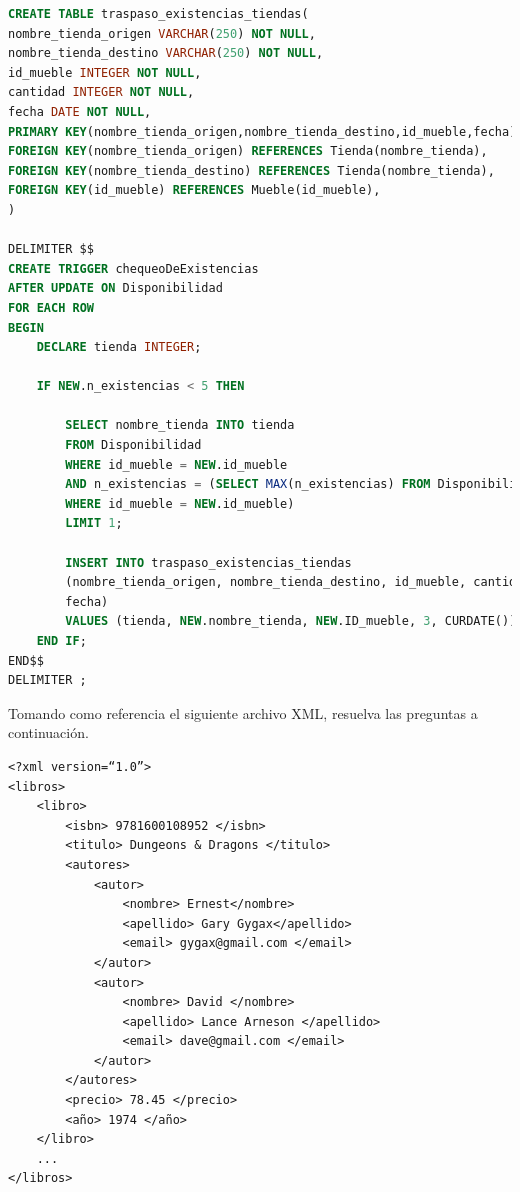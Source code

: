 \documentclass[
    12pt,
    a4paper,
    addpoints,
    answers,
    convocatoria=ord,
    titulacion=NoCD,
    curso=2022/2023,
]{db-exam}
\begin{document}
\begin{questions}
\begin{parts}
\begin{solution}
\begin{lstlisting}[language=sql]
CREATE TABLE traspaso_existencias_tiendas(
nombre_tienda_origen VARCHAR(250) NOT NULL,
nombre_tienda_destino VARCHAR(250) NOT NULL,
id_mueble INTEGER NOT NULL,
cantidad INTEGER NOT NULL,
fecha DATE NOT NULL,
PRIMARY KEY(nombre_tienda_origen,nombre_tienda_destino,id_mueble,fecha),
FOREIGN KEY(nombre_tienda_origen) REFERENCES Tienda(nombre_tienda),
FOREIGN KEY(nombre_tienda_destino) REFERENCES Tienda(nombre_tienda),
FOREIGN KEY(id_mueble) REFERENCES Mueble(id_mueble),
)

DELIMITER $$
CREATE TRIGGER chequeoDeExistencias
AFTER UPDATE ON Disponibilidad
FOR EACH ROW
BEGIN
    DECLARE tienda INTEGER;

    IF NEW.n_existencias < 5 THEN
    
        SELECT nombre_tienda INTO tienda
        FROM Disponibilidad
        WHERE id_mueble = NEW.id_mueble
        AND n_existencias = (SELECT MAX(n_existencias) FROM Disponibilidad
        WHERE id_mueble = NEW.id_mueble)
        LIMIT 1;

        INSERT INTO traspaso_existencias_tiendas 
        (nombre_tienda_origen, nombre_tienda_destino, id_mueble, cantidad, 
        fecha) 
        VALUES (tienda, NEW.nombre_tienda, NEW.ID_mueble, 3, CURDATE()); 
    END IF;
END$$
DELIMITER ;
\end{lstlisting}
\end{solution}
    
\end{parts}

\newpage
{}

Tomando como referencia el siguiente archivo XML, resuelva las preguntas a continuación.   

\begin{verbatim}
<?xml version=“1.0”>
<libros>
    <libro>
        <isbn> 9781600108952 </isbn>
        <titulo> Dungeons & Dragons </titulo>
        <autores>
            <autor>
                <nombre> Ernest</nombre>
                <apellido> Gary Gygax</apellido>
                <email> gygax@gmail.com </email>
            </autor>
            <autor>
                <nombre> David </nombre>
                <apellido> Lance Arneson </apellido>
                <email> dave@gmail.com </email>
            </autor>
        </autores>
        <precio> 78.45 </precio>
        <año> 1974 </año>
    </libro>
    ...
</libros>
\end{verbatim}


\end{questions}
\end{document}
